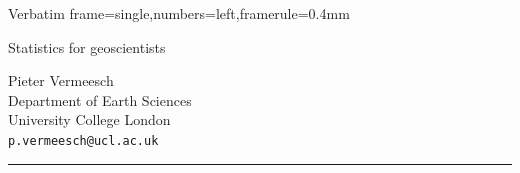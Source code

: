 \usepackage[top=3cm,bottom=3cm,left=3cm,right=2cm,twoside,a4paper]{geometry}
\usepackage[colorlinks=true,linktocpage=true]{hyperref}
\usepackage[misc]{ifsym}
\usepackage{upquote,amsmath,natbib,graphicx,utfsym}
\usepackage{enumitem}

\usepackage[skip=4pt]{caption}

\usepackage{fancyvrb}
\newenvironment{console}
               {\VerbatimEnvironment\begin{Verbatim}[frame=single,framerule=0.4mm]}
               {\end{Verbatim}}

                          {Verbatim}
                          {frame=single,numbers=left,framerule=0.4mm}

\renewcommand{\labelitemi}{--}
\newcommand{\tgap}{\hspace{1pt}}
\newcommand{\gap}{\hspace{4pt}}

\makeatletter
\def\bbordermatrix#1{\begingroup \m@th
  \@tempdima 4.75\p@
  \setbox\z@\vbox{%
    \def\cr{\crcr\noalign{\kern2\p@\global\let\cr\endline}}%
    \ialign{$##$\hfil\kern2\p@\kern\@tempdima&\thinspace\hfil$##$\hfil
      &&\quad\hfil$##$\hfil\crcr
      \omit\strut\hfil\crcr\noalign{\kern-\baselineskip}%
      #1\crcr\omit\strut\cr}}%
  \setbox\tw@\vbox{\unvcopy\z@\global\setbox\@ne\lastbox}%
  \setbox\tw@\hbox{\unhbox\@ne\unskip\global\setbox\@ne\lastbox}%
  \setbox\tw@\hbox{$\kern\wd\@ne\kern-\@tempdima\left[\kern-\wd\@ne
    \global\setbox\@ne\vbox{\box\@ne\kern2\p@}%
    \vcenter{\kern-\ht\@ne\unvbox\z@\kern-\baselineskip}\,\right]$}%
  \null\;\vbox{\kern\ht\@ne\box\tw@}\endgroup}
\makeatother

\raggedbottom


\begin{titlepage}
  
  \parbox[t]{0.93\textwidth}{
    \parbox[t]{0.91\textwidth}{
      \raggedleft
      \fontsize{50pt}{80pt}
      \vspace{0.7cm}
      \Huge
      Statistics for geoscientists\\
      
      \vspace{0.7cm}
    }
  }
  
  \vfill	
  \parbox[t]{0.93\textwidth}{
    \raggedleft
    \large
        {\Large Pieter Vermeesch}\\[4pt]
        Department of Earth Sciences\\
        University College London\\[4pt]
        \texttt{p.vermeesch@ucl.ac.uk}\\
	
        \hfill\rule{0.2\linewidth}{1pt}
}
	
\end{titlepage}

